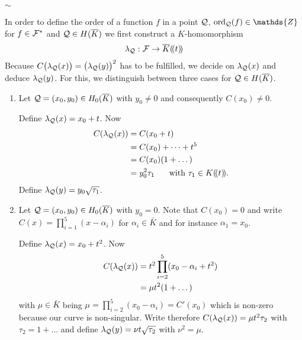 \documentclass[english,11pt,a4paper]{article}
\begin{document}
\vspace{-3mm}
\begin{center}
$\sim$
\end{center}

In order to define the order of a function $f$ in a point $\mathcal{Q}$, $\ordq (f) \in \mathds{Z}$ for $f \in \mathcal{F}^*$ and $\mathcal{Q} \in H(\overline K)$ we first construct a $K$-homomorphism
\begin{align*}
  \lambda_{\mathcal{Q}}: \mathcal{F} \rightarrow \overline K (\! (t)\! )
\end{align*}
Because $C\big(\lambda_{\mathcal{Q}}(x)\big)=\big(\lambda_{\mathcal{Q}}(y)\big)^2$ has to be fulfilled, we decide on $\lambda_{\mathcal{Q}}(x)$ and deduce $\lambda_{\mathcal{Q}}(y)$. For this, we distinguish between three cases for $\mathcal{Q} \in H(\overline K)$.

\begin{defin}
	\begin{enumerate}[1.]
		\item Let $\mathcal{Q} =(x_0,y_0) \in H_0(\overline K)$ with $y_0 \neq 0$ and consequently $C(x_0)\neq 0$.

		Define $\lambda_{\mathcal{Q}}(x) = x_0 + t$. Now
		\begin{align*}
		  C(\lpx) &= C(x_0+t)\\
		          &= C(x_0)+ \dots + t^5\\
		          &= C(x_0)(1 + \dots)\\ %
		          &= y_0^2 \tau_1 \text{\hspace{5mm} with } \tau_1 \in K (\! (t)\! ).
		\end{align*}
		Define $\lambda_{\mathcal{Q}}(y) = y_0 \sqrt{\tau_1}$.

		\item Let $\mathcal{Q} =(x_0,y_0) \in H_0(\overline K)$ with $y_0 = 0$.	Note that $C(x_0)=0$ and write $C(x)=\prod_{i=1}^5 (x-\alpha_i)$ for $\alpha_i \in \bar K$ and for instance $\alpha_1 = x_0$.

		Define $\lambda_{\mathcal{Q}}(x) = x_0 + t^2$. Now
		\begin{align*}
		  C(\lambda_{\mathcal{Q}}(x)) &= t^2 \prod_{i=2}^5 (x_0 -\alpha_i + t^2) \\
		          &= \mu t^2 (1 + \dots)
		\end{align*}
		with $\mu \in \bar K$ being $\mu = \prod_{i=2}^5 (x_0 - \alpha_i) = C'(x_0)$ which is non-zero because our curve is non-singular. Write therefore $C(\lambda_{\mathcal{Q}}(x)) = \mu t^2 \tau_2$ with $\tau_2 = 1 + \dots$ and define $\lambda_{\mathcal{Q}}(y) = \nu t \sqrt{\tau_2}$ with $\nu^2 = \mu$.


\end{enumerate}
\end{defin}
\end{document}
